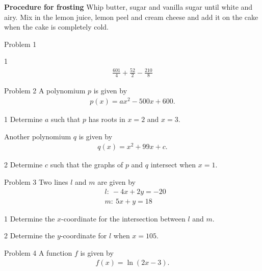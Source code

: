 \textbf{Procedure for frosting}
Whip butter, sugar and vanilla sugar until white and airy. Mix in the lemon juice, lemon peel and cream cheese and add it on the cake when the cake is completely cold. 

\newpage

\begin{opgavetekst}{Problem 1}
\end{opgavetekst}	
\begin{delopgave}{1}
	\begin{align*}
		\frac{601}{4} + \frac{52}{2} - \frac{210}{8}
	\end{align*}
\end{delopgave}
%
%
\begin{opgavetekst}{Problem 2}
	A polynomium $p$ is given by
	\begin{align*}
		p(x) = ax^2 - 500x + 600.
	\end{align*}
\end{opgavetekst}
\begin{delopgave}{1}
	Determine $a$ such that $p$ has roots in $x = 2$ and $x = 3$.  
\end{delopgave}
\begin{meretekst}
	Another polynomium $q$ is given by
	\begin{align*}
		q(x) = x^2 + 99x + c.
	\end{align*}
\end{meretekst}
\begin{delopgave}{2}
	Determine $c$ such that the graphs of $p$ and $q$ intersect when $x = 1$. 
\end{delopgave}
%
%
\begin{opgavetekst}{Problem 3}
	Two lines $l$ and $m$ are given by
	\begin{align*}
		&l: \ -4x + 2y = -20 \\
		&m: \ 5x + y = 18
	\end{align*}
\end{opgavetekst}
\begin{delopgave}{1}
	Determine the $x$-coordinate for the intersection between $l$ and $m$. 
\end{delopgave}
\begin{delopgave}{2}
	Determine the $y$-coordinate for $l$ when $x = 105$. 
\end{delopgave}
%
%
\begin{opgavetekst}{Problem 4}
	A function $f$ is given by
	\begin{align*}
		f(x) = \ln(2x-3).
	\end{align*}
\end{opgavetekst}
